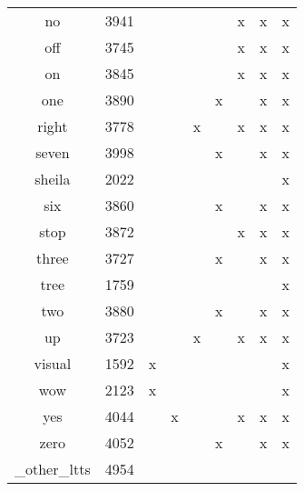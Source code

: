 \begin{table}[h!]
\begin{tabular}{|c|c|ccccccc|}
        no & 3941             &   &   &   &   & x & x & x  \\
        off & 3745            &   &   &   &   & x & x & x  \\
        \hline
        on & 3845             &   &   &   &   & x & x & x  \\
        one & 3890            &   &   &   & x &   & x & x  \\
        right & 3778          &   &   & x &   & x & x & x  \\
        seven & 3998          &   &   &   & x &   & x & x  \\
        \hline
        sheila & 2022         &   &   &   &   &   &   & x  \\
        six & 3860            &   &   &   & x &   & x & x  \\
        stop & 3872           &   &   &   &   & x & x & x  \\
        three & 3727          &   &   &   & x &   & x & x  \\
        \hline
        tree & 1759           &   &   &   &   &   &   & x  \\
        two & 3880            &   &   &   & x &   & x & x  \\
        up & 3723             &   &   & x &   & x & x & x  \\
        visual & 1592         & x &   &   &   &   &   & x  \\
        \hline
        wow & 2123            & x &   &   &   &   &   & x  \\
        yes & 4044            &   & x &   &   & x & x & x  \\
        zero & 4052           &   &   &   & x &   & x & x  \\
        \_other\_ltts & 4954  &   &   &   &   &   &   &    \\
        \hline
    \end{tabular}
\end{table}

